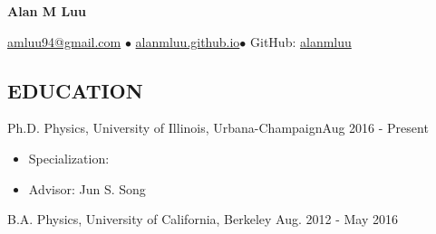 \documentclass{res}
\newcommand{\rfill}{\hspace*{\fill}}
\begin{document}
\raggedright
\centerline{\LARGE \textbf{Alan M Luu}}
\vspace{-10pt}
\noindent %
\centerline{ \href{mailto:amluu94@gmail.com}{amluu94@gmail.com} $\bullet$
\href{http://alanmluu.github.io}{alanmluu.github.io}$\bullet$
 GitHub: \href{https://github.com/alanmluu}{alanmluu}}
\vspace{1pt}
 \vspace{5pt}
\begin{resume}
\vspace{-30pt}
\section{EDUCATION}
\vspace{5pt}Ph.D. Physics, University of Illinois, Urbana-Champaign\rfill Aug 2016 - Present
\begin{itemize}
\item Specialization: %
\item Advisor: Jun S. Song
\end{itemize}
\vspace{5pt}B.A. Physics, University of California, Berkeley \rfill Aug. 2012 - May 2016
\vspace{-2pt}

\end{resume}
\end{document}
